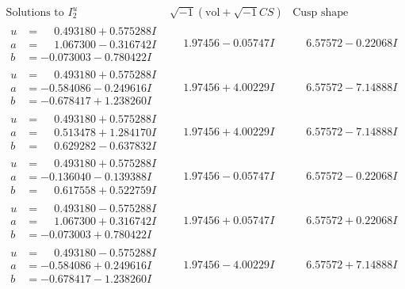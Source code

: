 \documentclass[1p]{elsarticle_modified}
\theoremstyle{definition}
\newcommand{\I}{\sqrt{-1}}
\begin{document}
$$\begin{array}{c|c|c}  
\text{Solutions to }I^u_{2}& \I (\text{vol} + \sqrt{-1}CS) & \text{Cusp shape}\\
 \hline 
\begin{aligned}
u &= \phantom{-}0.493180 + 0.575288 I \\
a &= \phantom{-}1.067300 - 0.316742 I \\
b &= -0.073003 - 0.780422 I\end{aligned}
 & \phantom{-}1.97456 - 0.05747 I & \phantom{-}6.57572 - 0.22068 I \\ \hline\begin{aligned}
u &= \phantom{-}0.493180 + 0.575288 I \\
a &= -0.584086 - 0.249616 I \\
b &= -0.678417 + 1.238260 I\end{aligned}
 & \phantom{-}1.97456 + 4.00229 I & \phantom{-}6.57572 - 7.14888 I \\ \hline\begin{aligned}
u &= \phantom{-}0.493180 + 0.575288 I \\
a &= \phantom{-}0.513478 + 1.284170 I \\
b &= \phantom{-}0.629282 - 0.637832 I\end{aligned}
 & \phantom{-}1.97456 + 4.00229 I & \phantom{-}6.57572 - 7.14888 I \\ \hline\begin{aligned}
u &= \phantom{-}0.493180 + 0.575288 I \\
a &= -0.136040 - 0.139388 I \\
b &= \phantom{-}0.617558 + 0.522759 I\end{aligned}
 & \phantom{-}1.97456 - 0.05747 I & \phantom{-}6.57572 - 0.22068 I \\ \hline\begin{aligned}
u &= \phantom{-}0.493180 - 0.575288 I \\
a &= \phantom{-}1.067300 + 0.316742 I \\
b &= -0.073003 + 0.780422 I\end{aligned}
 & \phantom{-}1.97456 + 0.05747 I & \phantom{-}6.57572 + 0.22068 I \\ \hline\begin{aligned}
u &= \phantom{-}0.493180 - 0.575288 I \\
a &= -0.584086 + 0.249616 I \\
b &= -0.678417 - 1.238260 I\end{aligned}
 & \phantom{-}1.97456 - 4.00229 I & \phantom{-}6.57572 + 7.14888 I \\ \hline\begin{aligned}

\end{aligned}
\end{array}$$
\end{document}
